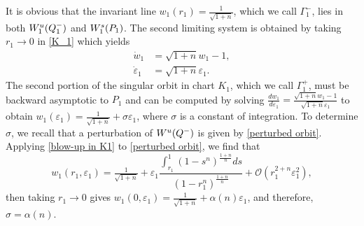 \documentclass[10pt,a4paper]{amsart}
\begin{document}
It is obvious that the invariant line $w_1(r_1)=\tfrac{1}{\sqrt{1+n}}$, which we call $\Gamma_1^-$, lies in both $W_1^{\rm u}(Q_1^-)$ and $W_1^{\rm s}(P_1)$. 
The second limiting system is obtained by taking $r_1\to0$ in \eqref{K_1} which yields
\begin{equation}
    \begin{aligned}
        \dot{w}_1&=\sqrt{1+n}w_1-1,\\
        \dot{\varepsilon}_1&=\sqrt{1+n}\varepsilon_1.
        \label{K_1, r_1=0}
    \end{aligned}
\end{equation}
The second portion of the singular orbit in chart $K_1$, which we call $\Gamma_1^+$, must be backward asymptotic to $P_1$ and can be computed by solving 
$\tfrac{d {w}_1}{d{\varepsilon}_1}=\tfrac{\sqrt{1+n}w_1-1}{\sqrt{1+n}\varepsilon_1}$ to obtain $w_1(\varepsilon_1)=\tfrac{1}{\sqrt{1+n}}+\sigma\varepsilon_1$, where $\sigma$ is a constant of integration. To determine $\sigma$, we recall that a perturbation of $W^{\rm u}(Q^-)$ is given by \eqref{perturbed orbit}.  Applying \eqref{blow-up in K1} to \eqref{perturbed orbit}, we find that 
\begin{equation}
    w_1(r_1, \varepsilon_1)=\tfrac{1}{\sqrt{1+n}}+\varepsilon_1
    \frac{\displaystyle \int_{r_1}^1 (1-s^n)^{\tfrac{1+n}{n}}ds}{(1-r_1^n)^{\tfrac{1+n}{n}}}+\mathcal{O}(r_1^{2+n}\varepsilon_1^2), 
    \label{w_1(r_1, eps_1)}
\end{equation}  
then taking $r_1\to0$ gives $w_1(0,\varepsilon_1)=\tfrac{1}{\sqrt{1+n}}+\alpha(n)\varepsilon_1$,
and therefore, $\sigma=\alpha(n)$.
\end{document}
